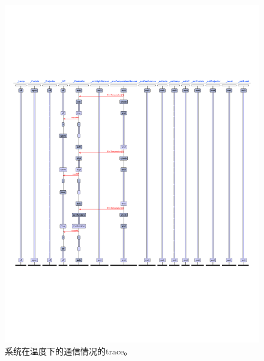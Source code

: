 \documentclass[journal, a4paper]{IEEEtran}
\begin{document}
\begin{figure}
    \centering
    \includegraphics[width=\columnwidth]{images/run2.pdf}
    \caption{系统在温度下的通信情况的trace。}
    \label{figure:run2}
\end{figure}
\end{document}
